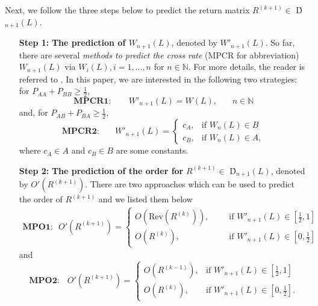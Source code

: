 \documentclass[11pt]{article}
\numberwithin{equation}{section}
\begin{document}
Next, we follow the three steps below to predict  the return matrix  $ R^{(k+1)} \in$ \'{D}$_{n+1}(L)$.
\begin{itemize}
\item[{\bf Step 1: }]{\bf  The prediction of  $W_{n+1}(L)$}, denoted by $W'_{n+1}(L)$.  So far, there are several {\it methods  to predict the cross rate} (MPCR for abbreviation)  $W_{n+1}(L)$  
via $W_i(L),i=1,...,n$ for  $n\in \mathbb{N}$.  For more details, the reader is referred to \cite{ALZ2001,PanpanRenWu}. In this paper, we are interested in  the following two strategies: 
 for $P_{AA}+P_{BB}\geqslant \frac{1}{2}$, 
\begin{equation*}
\textbf{MPCR1:}\,\, ~~~~~~~~W'_{n+1}(L)=W(L), ~~~~~~~~n\in \mathbb{N}
\end{equation*}
and,  for $P_{AB}+P_{BA}\geqslant \frac{1}{2}$,
\begin{equation*}
\textbf{MPCR2:} \,\,~~~~~~~
W'_{n+1}(L)=\begin{cases}
c_A, &\text{if }W_n(L)\in B\\
c_B, &\text{if }W_n(L)\in A,
\end{cases}
\end{equation*}
where $c_A\in A$ and $c_B\in B$ are some  constants.
\item[{\bf Step 2:}] {\bf  The prediction of  the order  for} $R^{(k+1)}\in $ \'{D}$_{n+1}(L)$, denoted by $O'(R^{(k+1)})$. 		
There are two approaches which can be used to predict the order of $R^{(k+1)}$ and we listed them below
\begin{equation*}
\begin{split}
\textbf{MPO1:}  ~~~O'(R^{(k+1)})=\begin{cases}
O( \mbox{Rev}(R^{(k)})), &~~~~~~~\text{if }W'_{n+1}(L)\in [\frac{1}{2},1]\\
O(R^{(k)}), &~~~~~~~\text{if }W'_{n+1}(L)\in [0,\frac{1}{2}]
\end{cases}
\end{split}
\end{equation*}
and
\begin{equation*}      
\textbf{MPO2:} \,\,\,~~O'(R^{(k+1)})=\begin{cases}
O(R^{(k-1)}), &\text{if }W'_{n+1}(L)\in [\frac{1}{2},1]\\
O(R^{(k)}), &\text{if }W'_{n+1}(L)\in [0,\frac{1}{2}].
\end{cases}
\end{equation*}
 

\end{itemize}
\end{document}
